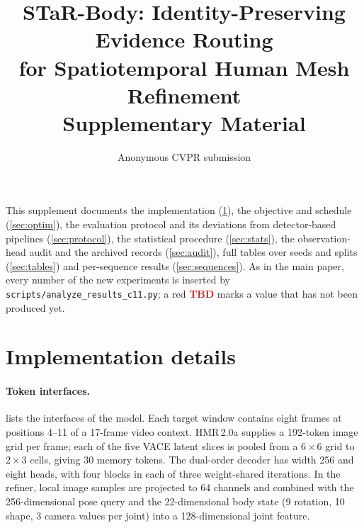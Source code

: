 \documentclass[10pt,onecolumn,letterpaper]{article}
\title{STaR-Body: Identity-Preserving Evidence Routing\\for Spatiotemporal Human Mesh Refinement\\[0.3em]\large Supplementary Material}
\author{Anonymous CVPR submission}
\begin{document}
\maketitle

\noindent This supplement documents the implementation (\cref{sec:impl}), the objective and schedule (\cref{sec:optim}), the evaluation protocol and its deviations from detector-based pipelines (\cref{sec:protocol}), the statistical procedure (\cref{sec:stats}), the observation-head audit and the archived records (\cref{sec:audit}), full tables over seeds and splits (\cref{sec:tables}) and per-sequence results (\cref{sec:sequences}).
As in the main paper, every number of the new experiments is inserted by \texttt{scripts/analyze\_results\_c11.py}; a red \textcolor{red}{\textbf{TBD}} marks a value that has not been produced yet.

\section{Implementation details}
\label{sec:impl}

\paragraph{Token interfaces.}
 lists the interfaces of the model.
Each target window contains eight frames at positions 4--11 of a 17-frame video context.
HMR\,2.0a supplies a 192-token image grid per frame; each of the five VACE latent slices is pooled from a $6\times6$ grid to $2\times3$ cells, giving 30 memory tokens.
The dual-order decoder has width 256 and eight heads, with four blocks in each of three weight-shared iterations.
In the refiner, local image samples are projected to 64 channels and combined with the 256-dimensional pose query and the 22-dimensional body state (9 rotation, 10 shape, 3 camera values per joint) into a 128-dimensional joint feature.
\end{document}
